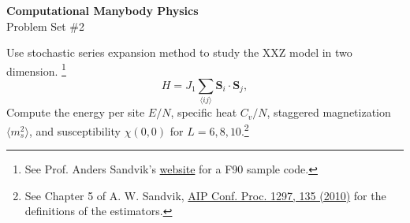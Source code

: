 \documentclass[12pt]{article}
\begin{document}
\begin{center}
\Large
\textbf{Computational Manybody Physics}\\
\large
Problem Set \#2\\


\end{center}
Use stochastic series expansion method to study the XXZ model in two dimension. \footnote{See Prof. Anders Sandvik's \href{http://physics.bu.edu/~sandvik/vietri/index.html}{website} for a F90 sample code.}
\[
H=J_1\sum_{\langle ij\rangle} \mathbf{S}_i \cdot \mathbf{S}_j ,
\]
Compute the energy per site $E/N$, specific heat $C_v/N$, staggered magnetization $\langle m_s^2 \rangle$, and susceptibility $\chi(0,0)$ 
for $L=6, 8, 10$.\footnote{See Chapter 5 of A. W. Sandvik, \href{http://arxiv.org/abs/1101.3281}{AIP Conf. Proc. 1297, 135 (2010)} for the definitions of the estimators.}
\end{document}
